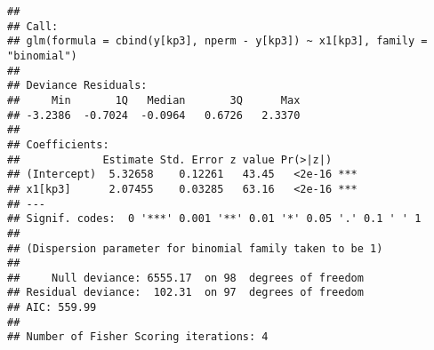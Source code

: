 \documentclass[]{article}
\newenvironment{Shaded}{\begin{snugshade}}{\end{snugshade}}
\newcommand{\KeywordTok}[1]{\textcolor[rgb]{0.13,0.29,0.53}{\textbf{#1}}}
\newcommand{\DataTypeTok}[1]{\textcolor[rgb]{0.13,0.29,0.53}{#1}}
\newcommand{\DecValTok}[1]{\textcolor[rgb]{0.00,0.00,0.81}{#1}}
\newcommand{\FloatTok}[1]{\textcolor[rgb]{0.00,0.00,0.81}{#1}}
\newcommand{\StringTok}[1]{\textcolor[rgb]{0.31,0.60,0.02}{#1}}
\newcommand{\ControlFlowTok}[1]{\textcolor[rgb]{0.13,0.29,0.53}{\textbf{#1}}}
\newcommand{\OperatorTok}[1]{\textcolor[rgb]{0.81,0.36,0.00}{\textbf{#1}}}
\newcommand{\NormalTok}[1]{#1}
\begin{document}
\begin{Shaded}
\end{Shaded}

\begin{verbatim}
## 
## Call:
## glm(formula = cbind(y[kp3], nperm - y[kp3]) ~ x1[kp3], family = "binomial")
## 
## Deviance Residuals: 
##     Min       1Q   Median       3Q      Max  
## -3.2386  -0.7024  -0.0964   0.6726   2.3370  
## 
## Coefficients:
##             Estimate Std. Error z value Pr(>|z|)    
## (Intercept)  5.32658    0.12261   43.45   <2e-16 ***
## x1[kp3]      2.07455    0.03285   63.16   <2e-16 ***
## ---
## Signif. codes:  0 '***' 0.001 '**' 0.01 '*' 0.05 '.' 0.1 ' ' 1
## 
## (Dispersion parameter for binomial family taken to be 1)
## 
##     Null deviance: 6555.17  on 98  degrees of freedom
## Residual deviance:  102.31  on 97  degrees of freedom
## AIC: 559.99
## 
## Number of Fisher Scoring iterations: 4
\end{verbatim}
\end{document}

